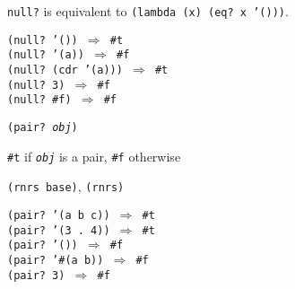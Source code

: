 \texttt{null?} is equivalent to \texttt{(lambda (x) (eq? x '()))}.

\begin{alltt}
(null? '()) \(\Rightarrow\) \#{}t
(null? '(a)) \(\Rightarrow\) \#{}f
(null? (cdr '(a))) \(\Rightarrow\) \#{}t
(null? 3) \(\Rightarrow\) \#{}f
(null? \#{}f) \(\Rightarrow\) \#{}f
\end{alltt}

\begin{description}

\label{objects_s16}\item[procedure] \texttt{(pair? \textit{obj})}



\item[returns] \texttt{\#{}t} if \texttt{\textit{obj}} is a pair, \texttt{\#{}f} otherwise


\item[libraries] \texttt{(rnrs base)}, \texttt{(rnrs)}
\end{description}


\begin{alltt}
(pair? '(a b c)) \(\Rightarrow\) \#{}t
(pair? '(3 . 4)) \(\Rightarrow\) \#{}t
(pair? '()) \(\Rightarrow\) \#{}f
(pair? '\#{}(a b)) \(\Rightarrow\) \#{}f
(pair? 3) \(\Rightarrow\) \#{}f
\end{alltt}

